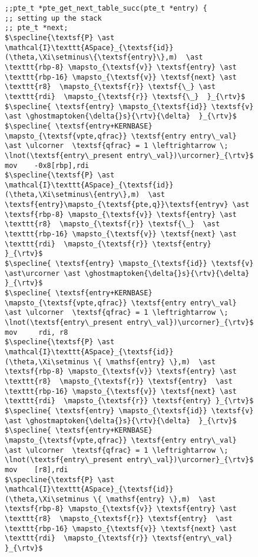 \begin{figure}\footnotesize
  \begin{lstlisting}[mathescape, basicstyle=\tiny]
;;pte_t *pte_get_next_table_succ(pte_t *entry) {
;; setting up the stack
;; pte_t *next;
$\specline{\textsf{P} \ast \mathcal{I}\texttt{ASpace}_{\textsf{id}}(\theta,\Xi\setminus\{\textsf{entry}\},m)  \ast \texttt{rbp-8} \mapsto_{\textsf{v}} \textsf{entry} \ast  \texttt{rbp-16} \mapsto_{\textsf{v}} \textsf{next} \ast \texttt{r8}  \mapsto_{\textsf{r}} \textsf{\_} \ast \texttt{rdi}  \mapsto_{\textsf{r}} \textsf{\_}  }_{\rtv}$
$\specline{ \textsf{entry} \mapsto_{\textsf{id}} \textsf{v} \ast \ghostmaptoken{\delta{}s}{\rtv}{\delta}  }_{\rtv}$
$\specline{ \textsf{entry+KERNBASE} \mapsto_{\textsf{vpte,qfrac}} \textsf{entry entry\_val} \ast \ulcorner  \textsf{qfrac} = 1 \leftrightarrow \; \lnot(\textsf{entry\_present entry\_val})\urcorner}_{\rtv}$
mov    -0x8[rbp],rdi
$\specline{\textsf{P} \ast \mathcal{I}\texttt{ASpace}_{\textsf{id}}(\theta,\Xi\setminus\{entry\},m)  \ast \textsf{entry}\mapsto_{\textsf{pte,q}}\textsf{entryv} \ast \textsf{rbp-8} \mapsto_{\textsf{v}} \textsf{entry} \ast \texttt{r8}  \mapsto_{\textsf{r}} \textsf{\_}  \ast  \texttt{rbp-16} \mapsto_{\textsf{v}} \textsf{next} \ast \texttt{rdi}  \mapsto_{\textsf{r}} \textsf{entry}  }_{\rtv}$
$\specline{ \textsf{entry} \mapsto_{\textsf{id}} \textsf{v} \ast\urcorner \ast \ghostmaptoken{\delta{}s}{\rtv}{\delta}  }_{\rtv}$
$\specline{ \textsf{entry+KERNBASE} \mapsto_{\textsf{vpte,qfrac}} \textsf{entry entry\_val} \ast \ulcorner  \textsf{qfrac} = 1 \leftrightarrow \; \lnot(\textsf{entry\_present entry\_val})\urcorner}_{\rtv}$
mov     rdi, r8
$\specline{\textsf{P} \ast \mathcal{I}\texttt{ASpace}_{\textsf{id}}(\theta,\Xi\setminus \{ \mathsf{entry} \},m)  \ast \textsf{rbp-8} \mapsto_{\textsf{v}} \textsf{entry} \ast \texttt{r8}  \mapsto_{\textsf{r}} \textsf{entry}  \ast  \texttt{rbp-16} \mapsto_{\textsf{v}} \textsf{next} \ast \texttt{rdi}  \mapsto_{\textsf{r}} \textsf{entry} }_{\rtv}$
$\specline{ \textsf{entry} \mapsto_{\textsf{id}} \textsf{v} \ast \ghostmaptoken{\delta{}s}{\rtv}{\delta}  }_{\rtv}$
$\specline{ \textsf{entry+KERNBASE} \mapsto_{\textsf{vpte,qfrac}} \textsf{entry entry\_val} \ast \ulcorner  \textsf{qfrac} = 1 \leftrightarrow \; \lnot(\textsf{entry\_present entry\_val})\urcorner}_{\rtv}$
mov    [r8],rdi
$\specline{\textsf{P} \ast \mathcal{I}\texttt{ASpace}_{\textsf{id}}(\theta,\Xi\setminus \{ \mathsf{entry} \},m)  \ast \textsf{rbp-8} \mapsto_{\textsf{v}} \textsf{entry} \ast \texttt{r8}  \mapsto_{\textsf{r}} \textsf{entry}  \ast  \texttt{rbp-16} \mapsto_{\textsf{v}} \textsf{next} \ast \texttt{rdi}  \mapsto_{\textsf{r}} \textsf{entry\_val}   }_{\rtv}$

\end{lstlisting}
\end{figure}
